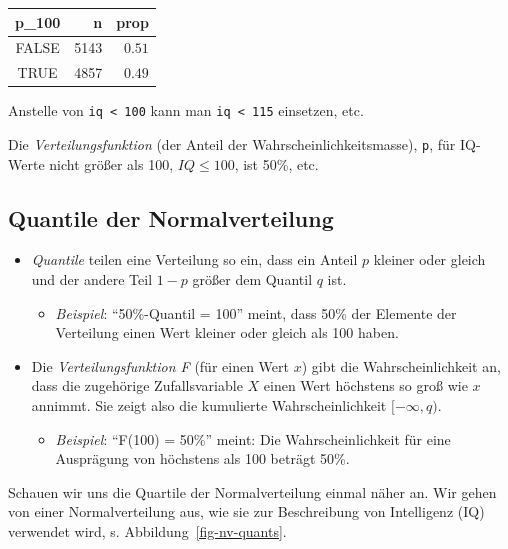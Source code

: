 \documentclass[
  a4paper,
  DIV=11]{scrreprt}
\providecommand{\tightlist}{%
  \setlength{\itemsep}{0pt}\setlength{\parskip}{0pt}}\usepackage{longtable,booktabs,array}
\theoremstyle{definition}
\theoremstyle{remark}
\begin{document}
\begin{longtable}{crr}
\toprule
p\_100 & n & prop \\ 
\midrule
FALSE & 5143 & $0.51$ \\ 
TRUE & 4857 & $0.49$ \\ 
\bottomrule
\end{longtable}

Anstelle von \texttt{iq\ \textless{}\ 100} kann man
\texttt{iq\ \textless{}\ 115} einsetzen, etc.

Die \emph{Verteilungsfunktion} (der Anteil der
Wahrscheinlichkeitsmasse), \texttt{p}, für IQ-Werte nicht größer als
100, \(IQ\le100\), ist 50\%, etc.

\hypertarget{quantile-der-normalverteilung}{%
\subsection{Quantile der
Normalverteilung}\label{quantile-der-normalverteilung}}

\begin{itemize}
\tightlist
\item
  \emph{Quantile} teilen eine Verteilung so ein, dass ein Anteil \(p\)
  kleiner oder gleich und der andere Teil \(1-p\) größer dem Quantil
  \(q\) ist.

  \begin{itemize}
  \tightlist
  \item
    \emph{Beispiel}: ``50\%-Quantil = 100'' meint, dass 50\% der
    Elemente der Verteilung einen Wert kleiner oder gleich als 100
    haben.
  \end{itemize}
\item
  Die \emph{Verteilungsfunktion F} (für einen Wert \(x\)) gibt die
  Wahrscheinlichkeit an, dass die zugehörige Zufallsvariable \(X\) einen
  Wert höchstens so groß wie \(x\) annimmt. Sie zeigt also die
  kumulierte Wahrscheinlichkeit \([-\infty, q)\).

  \begin{itemize}
  \tightlist
  \item
    \emph{Beispiel}: ``F(100) = 50\%'' meint: Die Wahrscheinlichkeit für
    eine Ausprägung von höchstens als 100 beträgt 50\%.
  \end{itemize}
\end{itemize}

Schauen wir uns die Quartile der Normalverteilung einmal näher an. Wir
gehen von einer Normalverteilung aus, wie sie zur Beschreibung von
Intelligenz (IQ) verwendet wird, s. Abbildung~\ref{fig-nv-quants}.
\end{document}
